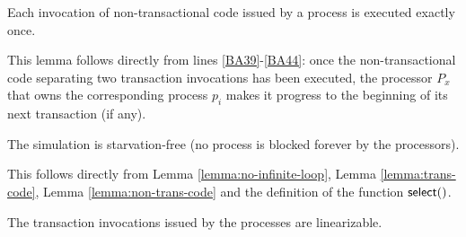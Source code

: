 \begin{lemma}
\label{lemma:non-trans-code}
Each invocation of non-transactional code issued by a process is
executed exactly once.
\end{lemma}

\begin{proofL}
This lemma  follows directly  from lines \ref{BA39}-\ref{BA44}:  once the
non-transactional  code separating two  transaction invocations  has been
executed, the processor $P_x$ that owns the corresponding process $p_i$ 
makes it progress to the beginning of its  next transaction (if any). 
\renewcommand{\toto}{lemma:non-trans-code}
\end{proofL}



\begin{lemma}
\label{lemma:process-progress}
The simulation is starvation-free (no process is blocked forever
by the processors).
\end{lemma}

\begin{proofL}
This follows directly from Lemma \ref{lemma:no-infinite-loop},
Lemma \ref{lemma:trans-code}, Lemma \ref{lemma:non-trans-code}
and the definition of the function ${\sf select}()$. 
\renewcommand{\toto}{lemma:process-progress}
\end{proofL}




\begin{lemma}
\label{lemma:trans-linearizability}
The transaction invocations issued by the processes are linearizable. 
%
%
\end{lemma}

